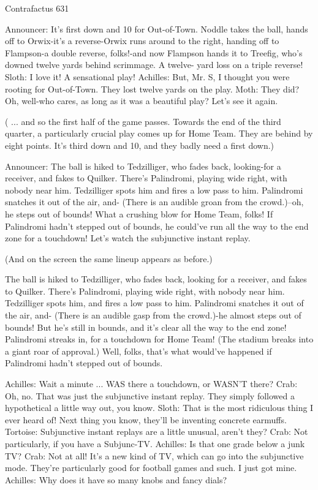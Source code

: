 Contrafactus                                                                                631

Announcer: It's first down and 10 for Out-of-Town. Noddle takes the ball, hands off to
   Orwix-it's a reverse-Orwix runs around to the right, handing off to Flampson-a double
   reverse, folks!-and now
Flampson hands it to Treefig, who's downed twelve yards behind scrimmage. A twelve-
   yard loss on a triple reverse!
Sloth: I love it! A sensational play!
Achilles: But, Mr. S, I thought you were rooting for Out-of-Town. They lost twelve yards
   on the play.
Moth: They did? Oh, well-who cares, as long as it was a beautiful play?
Let's see it again.

   ( ... and so the first half of the game passes. Towards the end of the third quarter, a
   particularly crucial play comes up for Home Team. They are behind by eight points.
   It's third down and 10, and they badly need a first down.)

Announcer: The ball is hiked to Tedzilliger, who fades back, looking-for a receiver, and
  fakes to Quilker. There's Palindromi, playing wide right, with nobody near him.
  Tedzilliger spots him and fires a low pass to him. Palindromi snatches it out of the air,
  and- (There is an audible groan from the crowd.)--oh, he steps out of bounds! What a
  crushing blow for Home Team, folks! If Palindromi hadn't stepped out of bounds, he
  could've run all the way to the end zone for a touchdown!
Let's watch the subjunctive instant replay.

   (And on the screen the same lineup appears as before.)

   The ball is hiked to Tedzilliger, who fades back, looking for a receiver, and fakes to
   Quilker. There's Palindromi, playing wide right, with nobody near him. Tedzilliger
   spots him, and fires a low pass to him. Palindromi snatches it out of the air, and-
   (There is an audible gasp from the crowd.)-he almost steps out of bounds! But he's
   still in bounds, and it's clear all the way to the end zone! Palindromi streaks in, for a
   touchdown for Home Team! (The stadium breaks into a giant roar of approval.) Well,
   folks, that's what would've happened if Palindromi hadn't stepped out of bounds.

Achilles: Wait a minute ... WAS there a touchdown, or WASN'T there?
Crab: Oh, no. That was just the subjunctive instant replay. They simply followed a
   hypothetical a little way out, you know.
Sloth: That is the most ridiculous thing I ever heard of! Next thing you know, they'll be
   inventing concrete earmuffs.
Tortoise: Subjunctive instant replays are a little unusual, aren't they?
Crab: Not particularly, if you have a Subjunc-TV.
Achilles: Is that one grade below a junk TV?
Crab: Not at all! It's a new kind of TV, which can go into the subjunctive mode. They're
   particularly good for football games and such. I just got mine.
Achilles: Why does it have so many knobs and fancy dials?





